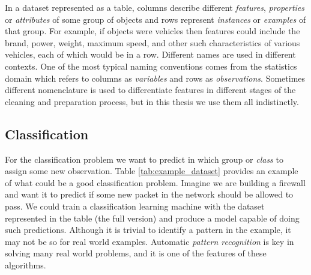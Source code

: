 In a dataset represented as a table, columns describe different \emph{features}, \emph{properties} or \emph{attributes} of some group of objects and rows represent \emph{instances} or \emph{examples} of that group. For example, if objects were vehicles then features could include the brand, power, weight, max\-imum speed, and other such characteristics of various vehicles, each of which would be in a row. Different names are used in different contexts. One of the most typical naming conventions comes from the statistics domain which refers to columns as \emph{variables} and rows as \emph{observations}. Sometimes different nomenclature is used to differentiate features in different stages of the cleaning and preparation process, but in this thesis we use them all indistinctly.

\begin{table}[h]
    \caption{Example dataset extracted from the Internet Firewall Data (\cite{ertam_internet_2019}). Only five observations and main variables shown. }
    \label{tab:example_dataset}
\end{table}

\subsection{Classification}
\label{sec:ch4.classification}

For the classification problem we want to predict in which group or \emph{class} to assign some new observation. Table \ref{tab:example_dataset} provides an example of what could be a good classification problem. Imagine we are building a firewall and want it to predict if some new packet in the network should be allowed to pass. We could train a classification learning machine with the dataset represented in the table (the full version) and produce a model capable of doing such predictions. Although it is trivial to identify a pattern in the example, it may not be so for real world examples. Automatic \emph{pattern recognition} is key in solving many real world problems, and it is one of the features of these algorithms.

